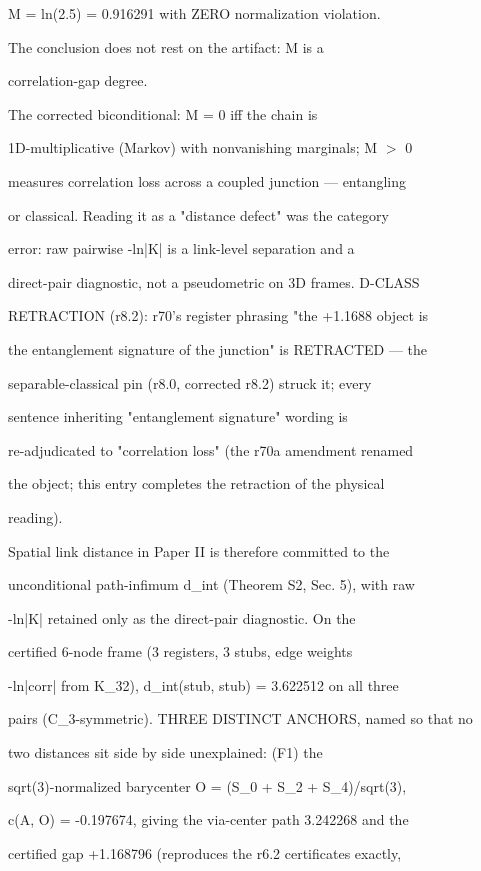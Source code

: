 \documentclass[11pt,a4paper]{article}
\theoremstyle{definition}
\begin{document}
    M = ln(2.5) = 0.916291 with ZERO normalization violation.

    The conclusion does not rest on the artifact: M is a

    correlation-gap degree.

The corrected biconditional: M = 0 iff the chain is

1D-multiplicative (Markov) with nonvanishing marginals; M $>$ 0

measures correlation loss across a coupled junction — entangling

or classical. Reading it as a "distance defect" was the category

error: raw pairwise -ln|K| is a link-level separation and a

direct-pair diagnostic, not a pseudometric on 3D frames. D-CLASS

RETRACTION (r8.2): r70's register phrasing "the +1.1688 object is

the entanglement signature of the junction" is RETRACTED — the

separable-classical pin (r8.0, corrected r8.2) struck it; every

sentence inheriting "entanglement signature" wording is

re-adjudicated to "correlation loss" (the r70a amendment renamed

the object; this entry completes the retraction of the physical

reading).


Spatial link distance in Paper II is therefore committed to the

unconditional path-infimum d\_int (Theorem S2, Sec. 5), with raw

-ln|K| retained only as the direct-pair diagnostic. On the

certified 6-node frame (3 registers, 3 stubs, edge weights

-ln|corr| from K\_32), d\_int(stub, stub) = 3.622512 on all three

pairs (C\_3-symmetric). THREE DISTINCT ANCHORS, named so that no

two distances sit side by side unexplained: (F1) the

sqrt(3)-normalized barycenter O = (S\_0 + S\_2 + S\_4)/sqrt(3),

c(A, O) = -0.197674, giving the via-center path 3.242268 and the

certified gap +1.168796 (reproduces the r6.2 certificates exactly,
\end{document}
